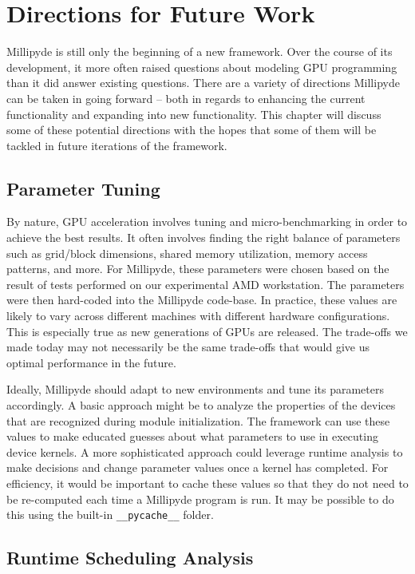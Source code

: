 \chapter{Directions for Future Work}

Millipyde is still only the beginning of a new framework. Over the course of its development, it more often raised questions about modeling GPU programming than it did answer existing questions. There are a variety of directions Millipyde can be taken in going forward -- both in regards to enhancing the current functionality and expanding into new functionality. This chapter will discuss some of these potential directions with the hopes that some of them will be tackled in future iterations of the framework.

\section{Parameter Tuning}

By nature, GPU acceleration involves tuning and micro-benchmarking in order to achieve the best results. It often involves finding the right balance of parameters such as grid/block dimensions, shared memory utilization, memory access patterns, and more. For Millipyde, these parameters were chosen based on the result of tests performed on our experimental AMD workstation. The parameters were then hard-coded into the Millipyde code-base. In practice, these values are likely to vary across different machines with different hardware configurations. This is especially true as new generations of GPUs are released. The trade-offs we made today may not necessarily be the same trade-offs that would give us optimal performance in the future.

\quad Ideally, Millipyde should adapt to new environments and tune its parameters accordingly. A basic approach might be to analyze the properties of the devices that are recognized during module initialization. The framework can use these values to make educated guesses about what parameters to use in executing device kernels. A more sophisticated approach could leverage runtime analysis to make decisions and change parameter values once a kernel has completed. For efficiency, it would be important to cache these values so that they do not need to be re-computed each time a Millipyde program is run. It may be possible to do this using the built-in \verb|__pycache__| folder.

\section{Runtime Scheduling Analysis}

